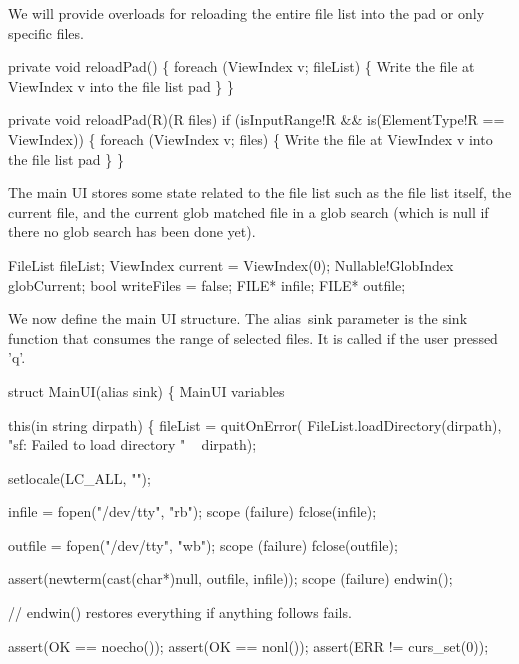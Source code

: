 \nwendcode{}We will provide overloads for reloading the entire file list into
the pad or only specific files.

\nwenddocs{}\endmoddef\nwstartdeflinemarkup\nwenddeflinemarkup
private void reloadPad()
\{
  foreach (ViewIndex v; fileList) \{
    \LA{}Write the file at ViewIndex v into the file list pad\RA{}
  \}
\}

private void reloadPad(R)(R files)
  if (isInputRange!R && is(ElementType!R == ViewIndex))
\{
  foreach (ViewIndex v; files) \{
    \LA{}Write the file at ViewIndex v into the file list pad\RA{}
  \}
\}

\nwendcode{}The main UI stores some state related to the file list such as the
file list itself, the current file, and the current glob matched file
in a glob search (which is null if there no glob search has been done
yet).

\nwenddocs{}\plusendmoddef\nwstartdeflinemarkup\nwenddeflinemarkup
FileList fileList;
ViewIndex current = ViewIndex(0);
Nullable!GlobIndex globCurrent;
bool writeFiles = false;
FILE* infile;
FILE* outfile;

\nwendcode{}We now define the main UI structure. The {\Tt{}alias\ sink\nwendquote} parameter is
the sink function that consumes the range of selected files. It is
called if the user pressed 'q'.

\nwenddocs{}\endmoddef\nwstartdeflinemarkup\nwenddeflinemarkup
struct MainUI(alias sink)
\{
  \LA{}MainUI variables\RA{}
  
  this(in string dirpath) \{
    fileList =
      quitOnError(
        FileList.loadDirectory(dirpath),
        "sf: Failed to load directory " ~ dirpath);

    setlocale(LC_ALL, "");

    infile  = fopen("/dev/tty", "rb");
    scope (failure) fclose(infile);
    
    outfile = fopen("/dev/tty", "wb");
    scope (failure) fclose(outfile);
    
    assert(newterm(cast(char*)null, outfile, infile));
    scope (failure) endwin();
    
    // endwin() restores everything if anything follows fails.
    
    assert(OK == noecho());
    assert(OK == nonl());
    assert(ERR != curs_set(0));
    

